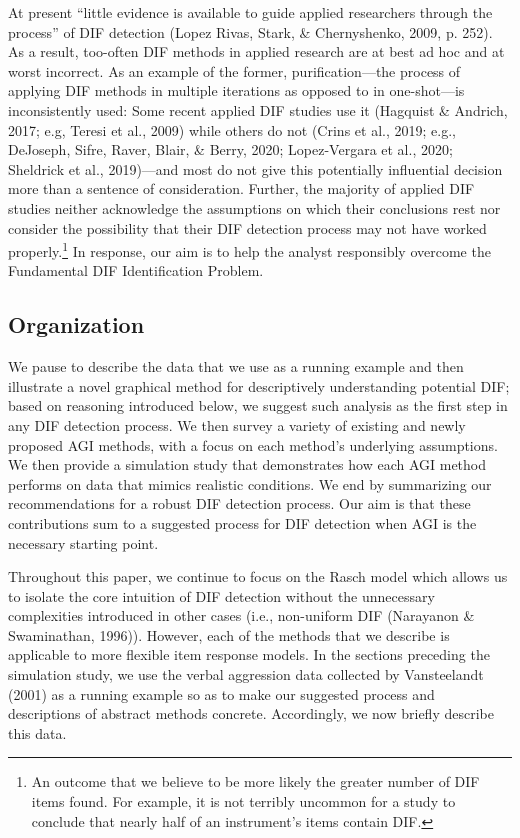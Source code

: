 \documentclass[
  english,
  man,floatsintext]{apa6}
\begin{document}
At present ``little evidence is available to guide applied researchers through the process'' of DIF detection (Lopez Rivas, Stark, \& Chernyshenko, 2009, p. 252). As a result, too-often DIF methods in applied research are at best ad hoc and at worst incorrect. As an example of the former, purification---the process of applying DIF methods in multiple iterations as opposed to in one-shot---is inconsistently used: Some recent applied DIF studies use it (Hagquist \& Andrich, 2017; e.g, Teresi et al., 2009) while others do not (Crins et al., 2019; e.g., DeJoseph, Sifre, Raver, Blair, \& Berry, 2020; Lopez-Vergara et al., 2020; Sheldrick et al., 2019)---and most do not give this potentially influential decision more than a sentence of consideration. Further, the majority of applied DIF studies neither acknowledge the assumptions on which their conclusions rest nor consider the possibility that their DIF detection process may not have worked properly.\footnote{An outcome that we believe to be more likely the greater number of DIF items found. For example, it is not terribly uncommon for a study to conclude that nearly half of an instrument's items contain DIF.} In response, our aim is to help the analyst responsibly overcome the Fundamental DIF Identification Problem.

\hypertarget{organization}{%
\subsection{Organization}\label{organization}}

We pause to describe the data that we use as a running example and then illustrate a novel graphical method for descriptively understanding potential DIF; based on reasoning introduced below, we suggest such analysis as the first step in any DIF detection process. We then survey a variety of existing and newly proposed AGI methods, with a focus on each method's underlying assumptions. We then provide a simulation study that demonstrates how each AGI method performs on data that mimics realistic conditions. We end by summarizing our recommendations for a robust DIF detection process. Our aim is that these contributions sum to a suggested process for DIF detection when AGI is the necessary starting point.

Throughout this paper, we continue to focus on the Rasch model which allows us to isolate the core intuition of DIF detection without the unnecessary complexities introduced in other cases (i.e., non-uniform DIF (Narayanon \& Swaminathan, 1996)). However, each of the methods that we describe is applicable to more flexible item response models. In the sections preceding the simulation study, we use the verbal aggression data collected by Vansteelandt (2001) as a running example so as to make our suggested process and descriptions of abstract methods concrete. Accordingly, we now briefly describe this data.
\end{document}
